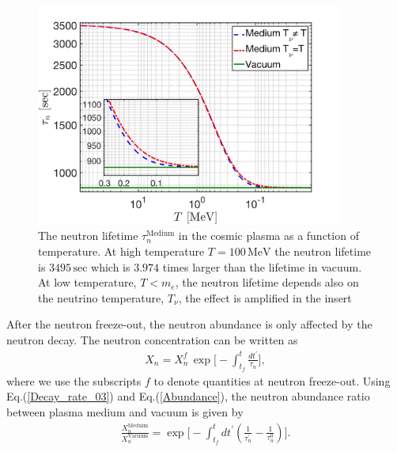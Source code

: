 \begin{figure} 
\centerline{\includegraphics[width=0.9\textwidth]{./plots/Neutron_Lifetime_001}}
\caption{The neutron lifetime $\tau_n^\mathrm{Medium}$ in the cosmic plasma as a function of temperature. At high temperature $T=100\,\mathrm{MeV}$ the neutron lifetime is $3495\,\mathrm{sec}$ which is $3.974$ times larger than the lifetime in vacuum. At low temperature, $T<m_e$, the neutron lifetime depends also on the neutrino temperature, $T_\nu$, the effect is amplified in the insert} %
\label{Decay_Rate} 
\end{figure}


After the neutron freeze-out, the neutron abundance is only affected by the neutron decay. The neutron concentration can be written as 
\begin{align}
\label{Abundance}
X_n=X_n^f\,\exp\bigg[-\int^t_{t_f}\frac{dt^\prime}{\tau_n}\bigg],
\end{align}
where we use the subscripts $f$ to denote quantities at neutron freeze-out. Using Eq.(\ref{Decay_rate_03}) and Eq.(\ref{Abundance}), the neutron abundance ratio between plasma medium and vacuum is given by
\begin{align}
\label{Abundance_Ratio}
\frac{X_n^{\mathrm{Meduim}}}{X_n^{\mathrm{Vacuum}}}=\exp\bigg[-\int^t_{t_f}dt^\prime\left(\frac{1}{\tau^\prime_n}-\frac{1}{\tau^0_n}\right)\bigg].
\end{align}

